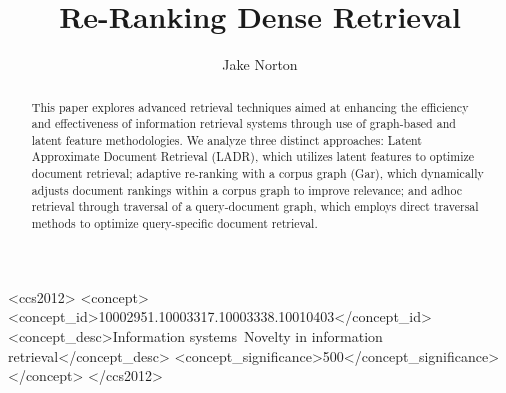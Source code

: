 \documentclass[sigconf,authorversion,nonacm]{acmart}
\begin{document}
\title{Re-Ranking Dense Retrieval}
\author{Jake Norton}




\begin{abstract}

	This paper explores advanced retrieval techniques aimed at enhancing the efficiency
	and effectiveness of information retrieval systems through use of graph-based and
	latent feature methodologies. We analyze three distinct approaches: Latent Approximate Document
	Retrieval (LADR), which utilizes latent features to optimize document retrieval; adaptive
	re-ranking with a corpus graph (Gar), which dynamically adjusts document rankings within a
	corpus graph to improve relevance; and adhoc retrieval through traversal of a query-document
	graph, which employs direct traversal methods to optimize query-specific document retrieval.

\end{abstract}


\begin{CCSXML} <ccs2012> <concept> <concept_id>10002951.10003317.10003338.10010403</concept_id>
	<concept_desc>Information systems~Novelty in information retrieval</concept_desc>
	<concept_significance>500</concept_significance> </concept> </ccs2012>
\end{CCSXML}







\end{document}
